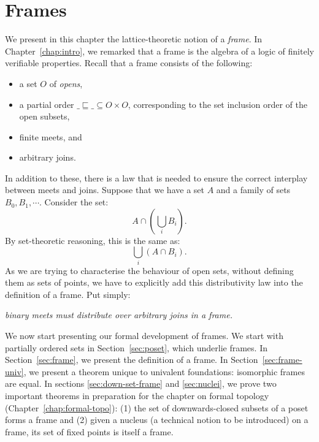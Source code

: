 \chapter{Frames}\label{chap:frames}

We present in this chapter the lattice-theoretic notion of a \emph{frame}. In
Chapter~\ref{chap:intro}, we remarked that a frame is the algebra of a logic of finitely
verifiable properties. Recall that a frame consists of the following:
\begin{itemize}
  \item a set $O$ of \emph{opens},
  \item a partial order $\_\sqsubseteq\_ \subseteq O \times O$, corresponding to the set inclusion order of the
    open subsets,
  \item finite meets, and
  \item arbitrary joins.
\end{itemize}

In addition to these, there is a law that is needed to ensure the correct interplay
between meets and joins. Suppose that we have a set $A$ and a family of sets $B_0, B_1,
\cdots$. Consider the set:
\begin{equation*}
  A \cap (\bigcup_i B_i).
\end{equation*}
By set-theoretic reasoning, this is the same as:
\begin{equation*}
  \bigcup_i (A \cap B_i).
\end{equation*}
As we are trying to characterise the behaviour of open sets, without defining them as sets
of points, we have to explicitly add this distributivity law into the definition of a
frame. Put simply:
\begin{center}
  \emph{binary meets must distribute over arbitrary joins in a frame.}
\end{center}

We now start presenting our formal development of frames. We start with partially ordered
sets in Section~\ref{sec:poset}, which underlie frames. In Section~\ref{sec:frame}, we
present the definition of a frame. In Section~\ref{sec:frame-univ}, we present a theorem
unique to univalent foundations: isomorphic frames are equal. In sections
\ref{sec:down-set-frame} and \ref{sec:nuclei}, we prove two important theorems in
preparation for the chapter on formal topology (Chapter~\ref{chap:formal-topo}): (1) the
set of downwards-closed subsets of a poset forms a frame and (2) given a nucleus (a
technical notion to be introduced) on a frame, its set of fixed points is itself a frame.

